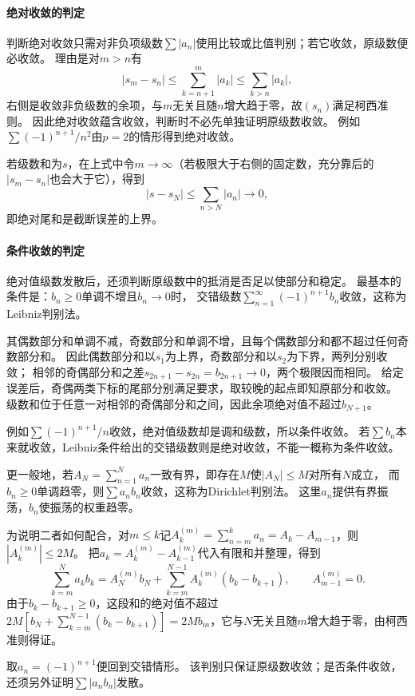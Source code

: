 \paragraph{绝对收敛的判定}
判断绝对收敛只需对非负项级数$\sum|a_n|$使用比较或比值判别；若它收敛，原级数便必收敛。
理由是对$m>n$有
\[
 |s_m-s_n|\leq\sum_{k=n+1}^{m}|a_k|\leq\sum_{k>n}|a_k|,
\]
右侧是收敛非负级数的余项，与$m$无关且随$n$增大趋于零，故$(s_n)$满足柯西准则。
因此绝对收敛蕴含收敛，判断时不必先单独证明原级数收敛。
例如$\sum(-1)^{n+1}/n^2$由$p=2$的情形得到绝对收敛。

若级数和为$s$，在上式中令$m\to\infty$（若极限大于右侧的固定数，充分靠后的$|s_m-s_n|$也会大于它），得到
\[
 |s-s_N|\leq\sum_{n>N}|a_n|\longrightarrow0,
\]
即绝对尾和是截断误差的上界。

\paragraph{条件收敛的判定}
绝对值级数发散后，还须判断原级数中的抵消是否足以使部分和稳定。
最基本的条件是：$b_n\geq0$单调不增且$b_n\to0$时，
交错级数$\sum_{n=1}^{\infty}(-1)^{n+1}b_n$收敛，这称为Leibniz判别法。

其偶数部分和单调不减，奇数部分和单调不增，且每个偶数部分和都不超过任何奇数部分和。
因此偶数部分和以$s_1$为上界，奇数部分和以$s_2$为下界，两列分别收敛；
相邻的奇偶部分和之差$s_{2n+1}-s_{2n}=b_{2n+1}\to0$，两个极限因而相同。
给定误差后，奇偶两类下标的尾部分别满足要求，取较晚的起点即知原部分和收敛。
级数和位于任意一对相邻的奇偶部分和之间，因此余项绝对值不超过$b_{N+1}$。

例如$\sum(-1)^{n+1}/n$收敛，绝对值级数却是调和级数，所以条件收敛。
若$\sum b_n$本来就收敛，Leibniz条件给出的交错级数则是绝对收敛，不能一概称为条件收敛。

更一般地，若$A_N=\sum_{n=1}^{N}a_n$一致有界，即存在$M$使$|A_N|\leq M$对所有$N$成立，
而$b_n\geq0$单调趋零，则$\sum a_nb_n$收敛，这称为Dirichlet判别法。
这里$a_n$提供有界振荡，$b_n$使振荡的权重趋零。

为说明二者如何配合，对$m\leq k$记$A_k^{(m)}=\sum_{n=m}^{k}a_n=A_k-A_{m-1}$，则$|A_k^{(m)}|\leq2M$。
把$a_k=A_k^{(m)}-A_{k-1}^{(m)}$代入有限和并整理，得到
\[
 \sum_{k=m}^{N}a_kb_k
 =A_N^{(m)}b_N+
   \sum_{k=m}^{N-1}A_k^{(m)}(b_k-b_{k+1}),
 \qquad A_{m-1}^{(m)}=0.
\]
由于$b_k-b_{k+1}\geq0$，这段和的绝对值不超过
$2M[b_N+\sum_{k=m}^{N-1}(b_k-b_{k+1})]=2Mb_m$，它与$N$无关且随$m$增大趋于零，由柯西准则得证。

取$a_n=(-1)^{n+1}$便回到交错情形。
该判别只保证原级数收敛；是否条件收敛，还须另外证明$\sum|a_nb_n|$发散。


